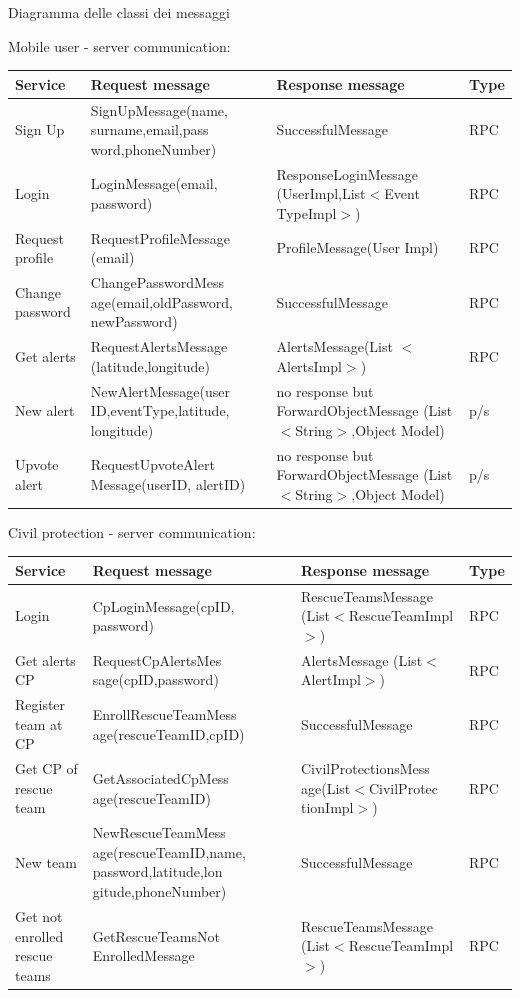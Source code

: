 \documentclass[a4paper,12pt]{report}
\begin{document}
Diagramma delle classi dei messaggi

Mobile user - server communication:

\begin{center}
\begin{tabular}{ |p{4cm}|p{4cm}|p{4cm}|p{2cm}| } 
\hline
Service 			& Request message 	& Response message		& Type 	\\
\hline
Sign Up  			& SignUpMessage(name, surname,email,pass word,phoneNumber)		& SuccessfulMessage 	& RPC	\\ 
Login 				& LoginMessage(email, password) 	& ResponseLoginMessage (UserImpl,List$<$Event TypeImpl$>$)	& RPC	\\ 
Request profile 	& RequestProfileMessage (email)		& ProfileMessage(User Impl)	& RPC	\\ 
Change password		& ChangePasswordMess age(email,oldPassword, newPassword)	& SuccessfulMessage	& RPC	\\
Get alerts		& RequestAlertsMessage (latitude,longitude)	& AlertsMessage(List $<$AlertsImpl$>$)	& RPC	\\
New alert		& NewAlertMessage(user ID,eventType,latitude, longitude)	& no response but ForwardObjectMessage (List$<$String$>$,Object Model)	& p/s	\\
Upvote alert		& RequestUpvoteAlert Message(userID, alertID)	& no response but ForwardObjectMessage (List$<$String$>$,Object Model)	& p/s	\\
\hline
\end{tabular}
\end{center}

Civil protection - server communication:

\begin{center}
\begin{tabular}{ |p{4cm}|p{4cm}|p{4cm}|p{2cm}| } 
\hline
Service 			& Request message 	& Response message		& Type 	\\
\hline
Login	& CpLoginMessage(cpID, password)	& RescueTeamsMessage (List$<$RescueTeamImpl$>$) 	& RPC	\\ 
Get alerts CP	& RequestCpAlertsMes sage(cpID,password)	& AlertsMessage (List$<$AlertImpl$>$) 	& RPC	\\ 
Register team at CP		& EnrollRescueTeamMess age(rescueTeamID,cpID)	& SuccessfulMessage & RPC	\\ 
Get CP of rescue team 	& GetAssociatedCpMess age(rescueTeamID)		& CivilProtectionsMess age(List$<$CivilProtec tionImpl$>$)	& RPC	\\ 
New team	& NewRescueTeamMess age(rescueTeamID,name, password,latitude,lon gitude,phoneNumber)	& SuccessfulMessage	& RPC	\\
Get not enrolled rescue teams & GetRescueTeamsNot EnrolledMessage	& RescueTeamsMessage (List$<$RescueTeamImpl$>$)	& RPC	\\
\hline
\end{tabular}
\end{center}
\end{document}
